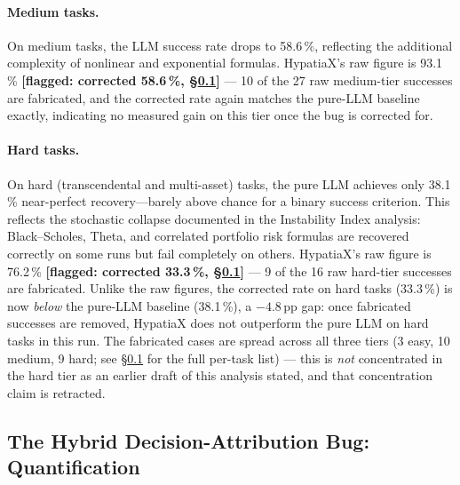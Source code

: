 \documentclass[twoside,11pt]{article}
\begin{document}
\paragraph{Medium tasks.}
On medium tasks, the LLM success rate drops to 58.6\,\%, reflecting the additional
complexity of nonlinear and exponential formulas.  HypatiaX's raw figure is 93.1\,\%
\textbf{[flagged: corrected 58.6\,\%, \S\ref{sec:hybrid-attribution-bug}]}
--- 10 of the 27 raw medium-tier successes are fabricated, and the corrected
rate again matches the pure-LLM baseline exactly, indicating no measured gain
on this tier once the bug is corrected for.

\paragraph{Hard tasks.}
On hard (transcendental and multi-asset) tasks, the pure LLM achieves only 38.1\,\%
near-perfect recovery---barely above chance for a binary success criterion.  This
reflects the stochastic collapse documented in the Instability Index analysis:
Black--Scholes, Theta, and correlated portfolio risk formulas are recovered correctly
on some runs but fail completely on others.  HypatiaX's raw figure is 76.2\,\%
\textbf{[flagged: corrected 33.3\,\%, \S\ref{sec:hybrid-attribution-bug}]} ---
9 of the 16 raw hard-tier successes are fabricated. Unlike the raw figures,
the corrected rate on hard tasks (33.3\,\%) is now \emph{below} the pure-LLM
baseline (38.1\,\%), a $-4.8$\,pp gap: once fabricated successes are removed,
HypatiaX does not outperform the pure LLM on hard tasks in this run.
The fabricated cases are spread across all three tiers (3 easy, 10 medium, 9
hard; see \S\ref{sec:hybrid-attribution-bug} for the full per-task list) ---
this is \emph{not} concentrated in the hard tier as an earlier draft of this
analysis stated, and that concentration claim is retracted.

\subsection{The Hybrid Decision-Attribution Bug: Quantification}
\label{sec:hybrid-attribution-bug}
\end{document}
